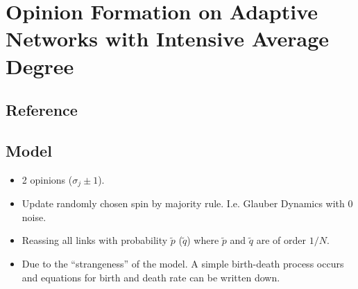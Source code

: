 \documentclass[a4paper]{scrartcl}
\begin{document}
\section{Opinion Formation on Adaptive Networks with Intensive Average Degree}
  \subsection{Reference}
  \subsection{Model}
    \begin{itemize}
      \item 2 opinions ($\sigma_j\pm1$).
      \item Update randomly chosen spin by majority rule. I.e. Glauber Dynamics
        with 0 noise.
      \item Reassing all links with probability $\tilde p$ ($\tilde q$) where
        $\tilde p$ and $\tilde q$ are of order $1/N$.
      \item Due to the ``strangeness'' of the model. A simple birth-death
        process occurs and equations for birth and death rate can be written
        down.
    \end{itemize}


\end{document}
